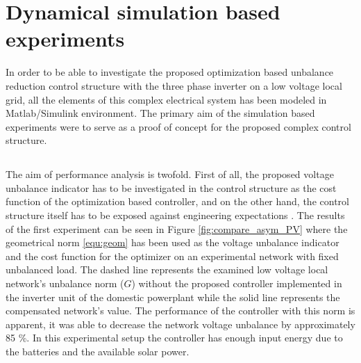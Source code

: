 %

    \section{Dynamical simulation based experiments}\label{VUB:sec:Results}
		
    In order to be able to investigate the proposed optimization based unbalance reduction control structure with the three phase inverter on a low voltage local grid, all the elements of this complex electrical system  has been modeled in Matlab/Simulink environment. The primary aim of the simulation based experiments were to serve as a proof of concept for the proposed complex control structure.

    \subsection{}\label{VUB:sec:Performance}

    The aim of performance analysis is twofold. First of all, the proposed voltage unbalance indicator has to be investigated in the control structure as the cost function of the optimization based controller, and on the other hand, the control structure itself has to be exposed against engineering expectations .
    The results of the first experiment can be seen in Figure \ref{fig:compare_asym_PV} where the geometrical norm \ref{equ:geom} has been used as the voltage unbalance indicator and the cost function for the optimizer on an experimental network with fixed unbalanced load.  The dashed line represents the examined low voltage local network's  unbalance norm ($G$) without the proposed controller implemented in the inverter unit of the domestic powerplant while the solid line represents the compensated network's value. 
     The performance of the controller with this norm is apparent, it was able to decrease the network voltage unbalance by approximately 85 \%. In this experimental setup the controller has enough input energy due to the batteries and the available solar power.

